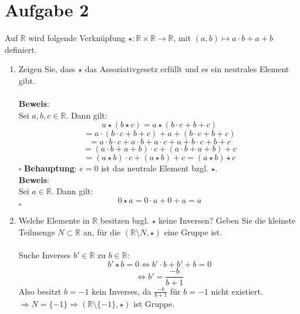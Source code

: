 \documentclass[11pt,a4paper,ngerman]{article}
\newcommand{\R}{\mathbb{R}}
\begin{document}
\section*{Aufgabe 2}

Auf $\R$ wird folgende Verknüpfung $\star : \R \times \R \to \R$, mit $(a,b) \mapsto a \cdot b + a + b$ definiert.

\begin{enumerate}[\bfseries a)]

\item Zeigen Sie, dass $\star$ das Assoziativgesetz erfüllt und es ein neutrales Element gibt.
\\ \\
\textbf{Beweis}: \\
Sei $a,b,c \in \R$. Dann gilt: \\
$$ a \star (b \star c) = a \star (b \cdot c + b +c) $$
$$ = a \cdot (b \cdot c + b + c) + a + (b \cdot c + b + c) $$
$$ = a \cdot b \cdot c + a \cdot b + a \cdot c + a + b \cdot c + b +c $$
$$ = (a \cdot b + a + b) \cdot c + (a \cdot b +a + b)+c $$
$$ = (a \star b) \cdot c + (a \star b) + c = (a \star b) \star c $$
\mbox{} \hfill $\square$
\newpage
\textbf{Behauptung}: $e = 0$ ist das neutrale Element bzgl. $\star$. \\
\textbf{Beweis}: \\
Sei $a \in \R$. Dann gilt: \\
$$ 0 \star a = 0 \cdot a + 0 + a = a $$
\mbox{} \hfill $\square$
\item Welche Elemente in $\R$ besitzen bzgl. $\star$ keine Inversen? Geben Sie die kleinste Teilmenge $N \subset \R$ an, für die $(\R \setminus N,\star)$ eine Gruppe ist.
\\ \\
Suche Inverses $b' \in \R$ zu $b \in \R$: \\
$$ b' \star b = 0 \Leftrightarrow b' \cdot b + b' + b = 0 $$
$$ \Leftrightarrow b' = \frac{-b}{b+1} $$
Also besitzt $b = -1$ kein Inverses, da $\frac{-b}{b+1}$ für $b = -1$ nicht existiert. \\
$ \Rightarrow N = \{-1\} \Rightarrow (\R \setminus \{-1\}, \star)$ ist Gruppe.
\end{enumerate}
\end{document}
